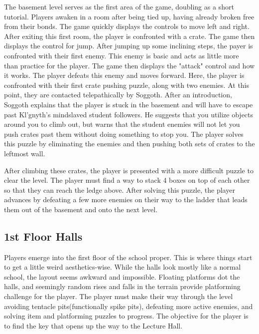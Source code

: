 \documentclass [12pt]{article}
\begin{document}
The basement level serves as the first area of the game, doubling as a short tutorial. Players awaken in a room after being tied up, having already broken free from their bonds. The game quickly displays the controls to move left and right. After exiting this first room, the player is confronted with a crate. The game then displays the control for jump. After jumping up some inclining steps, the payer is confronted with their first enemy. This enemy is basic and acts as little more than practice for the player. The game then displays the "attack" control and how it works. The player defeats this enemy and moves forward. Here, the player is confronted with their first crate pushing puzzle, along with two enemies. At this point, they are contacted telepathically by Soggoth. After an introduction, Soggoth explains that the player is stuck in the basement and will have to escape past Kl'gnyth's mindslaved student followers. He suggests that you utilize objects around you to climb out, but warns that the student enemies will not let you push crates past them without doing something to stop you. The player solves this puzzle by eliminating the enemies and then pushing both sets of crates to the leftmost wall.

After climbing these crates, the player is presented with a more difficult puzzle to clear the level. The player must find a way to stack 4 boxes on top of each other so that they can reach the ledge above. After solving this puzzle, the player advances by defeating a few more enemies on their way to the ladder that leads them out of the basement and onto the next level.

\subsection*{1st Floor Halls}

Players emerge into the first floor of the school proper. This is where things start to get a little weird aesthetics-wise. While the halls look mostly like a normal school, the layout seems awkward and impossible. Floating platforms dot the halls, and seemingly random rises and falls in the terrain provide platforming challenge for the player. The player must make their way through the level avoiding tentacle pits(functionally spike pits), defeating more active enemies, and solving item and platforming puzzles to progress. The objective for the player is to find the key that opens up the way to the Lecture Hall.
\end{document}

